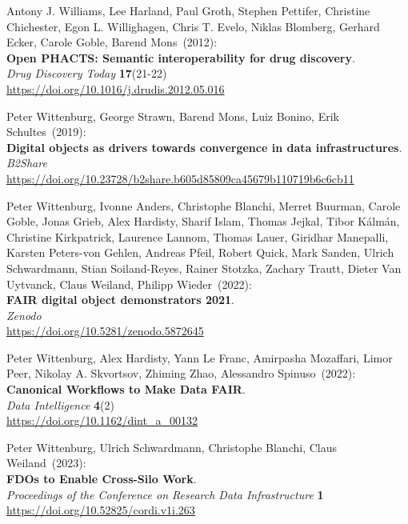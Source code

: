 \begin{thebibliography}{9}
Antony J. Williams, Lee Harland, Paul Groth, Stephen Pettifer, Christine Chichester, Egon L. Willighagen, Chris T. Evelo, Niklas Blomberg, Gerhard Ecker, Carole Goble, Barend Mons~(2012): \\
\textbf{Open {PHACTS}: Semantic interoperability for drug discovery}.\\
\emph{Drug Discovery Today} \textbf{17}(21-22) \\
\url{https://doi.org/10.1016/j.drudis.2012.05.016}

Peter Wittenburg, George Strawn, Barend Mons, Luiz Bonino, Erik Schultes~(2019): \\
\textbf{Digital objects as drivers towards convergence in data infrastructures}. \\
\emph{B2Share}\\
\url{https://doi.org/10.23728/b2share.b605d85809ca45679b110719b6c6cb11}

Peter Wittenburg, Ivonne Anders, Christophe Blanchi, Merret Buurman, Carole Goble, Jonas Grieb, Alex Hardisty, Sharif Islam, Thomas Jejkal, Tibor Kálmán, Christine Kirkpatrick, Laurence Lannom, Thomas Lauer, Giridhar Manepalli, Karsten Peters-von Gehlen, Andreas Pfeil, Robert Quick, Mark Sanden, Ulrich Schwardmann, Stian Soiland-Reyes, Rainer Stotzka, Zachary Trautt, Dieter Van Uytvanck, Claus Weiland, Philipp Wieder~(2022): \\
\textbf{FAIR digital object demonstrators 2021}.\\
\emph{Zenodo}\\
\url{https://doi.org/10.5281/zenodo.5872645}

Peter Wittenburg, Alex Hardisty, Yann Le Franc, Amirpasha Mozaffari, Limor Peer, Nikolay A. Skvortsov, Zhiming Zhao, Alessandro Spinuso~(2022): \\
\textbf{Canonical Workflows to Make Data FAIR}.\\
\emph{Data Intelligence} \textbf{4}(2)\\
\url{https://doi.org/10.1162/dint_a_00132}

Peter Wittenburg, Ulrich Schwardmann, Christophe Blanchi, Claus Weiland~(2023): \\
\textbf{FDOs to Enable Cross-Silo Work}.\\
\emph{Proceedings of the Conference on Research Data Infrastructure}
\textbf{1} \\
\url{https://doi.org/10.52825/cordi.v1i.263}


\end{thebibliography}
